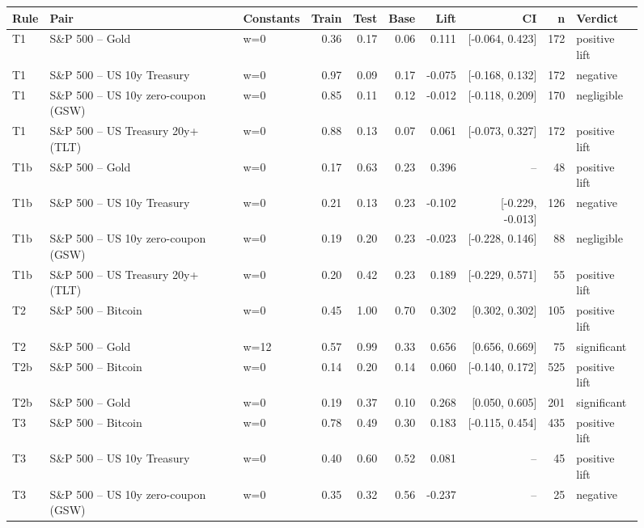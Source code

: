 \begin{figure}
\centering
\begin{tabular}{lllrrrrrrl}
\toprule
Rule & Pair & Constants & Train & Test & Base & Lift & CI & n & Verdict \\
\midrule
T1 & S\&P 500 -- Gold & w=0 & 0.36 & 0.17 & 0.06 & 0.111 & [-0.064, 0.423] & 172 & positive lift \\
T1 & S\&P 500 -- US 10y Treasury & w=0 & 0.97 & 0.09 & 0.17 & -0.075 & [-0.168, 0.132] & 172 & negative \\
T1 & S\&P 500 -- US 10y zero-coupon (GSW) & w=0 & 0.85 & 0.11 & 0.12 & -0.012 & [-0.118, 0.209] & 170 & negligible \\
T1 & S\&P 500 -- US Treasury 20y+ (TLT) & w=0 & 0.88 & 0.13 & 0.07 & 0.061 & [-0.073, 0.327] & 172 & positive lift \\
T1b & S\&P 500 -- Gold & w=0 & 0.17 & 0.63 & 0.23 & 0.396 & -- & 48 & positive lift \\
T1b & S\&P 500 -- US 10y Treasury & w=0 & 0.21 & 0.13 & 0.23 & -0.102 & [-0.229, -0.013] & 126 & negative \\
T1b & S\&P 500 -- US 10y zero-coupon (GSW) & w=0 & 0.19 & 0.20 & 0.23 & -0.023 & [-0.228, 0.146] & 88 & negligible \\
T1b & S\&P 500 -- US Treasury 20y+ (TLT) & w=0 & 0.20 & 0.42 & 0.23 & 0.189 & [-0.229, 0.571] & 55 & positive lift \\
T2 & S\&P 500 -- Bitcoin & w=0 & 0.45 & 1.00 & 0.70 & 0.302 & [0.302, 0.302] & 105 & positive lift \\
T2 & S\&P 500 -- Gold & w=12 & 0.57 & 0.99 & 0.33 & 0.656 & [0.656, 0.669] & 75 & significant \\
T2b & S\&P 500 -- Bitcoin & w=0 & 0.14 & 0.20 & 0.14 & 0.060 & [-0.140, 0.172] & 525 & positive lift \\
T2b & S\&P 500 -- Gold & w=0 & 0.19 & 0.37 & 0.10 & 0.268 & [0.050, 0.605] & 201 & significant \\
T3 & S\&P 500 -- Bitcoin & w=0 & 0.78 & 0.49 & 0.30 & 0.183 & [-0.115, 0.454] & 435 & positive lift \\
T3 & S\&P 500 -- US 10y Treasury & w=0 & 0.40 & 0.60 & 0.52 & 0.081 & -- & 45 & positive lift \\
T3 & S\&P 500 -- US 10y zero-coupon (GSW) & w=0 & 0.35 & 0.32 & 0.56 & -0.237 & -- & 25 & negative \\

\end{tabular}
\end{figure}
